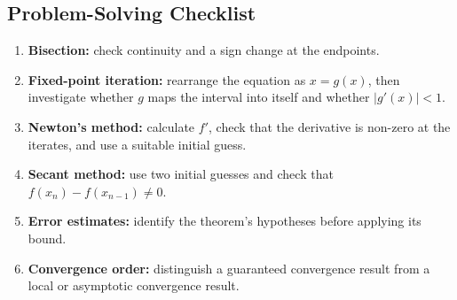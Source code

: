 \subsection{Problem-Solving Checklist}

\begin{remark}
  \begin{enumerate}\emph{}
    \item \textbf{Bisection:} check continuity and a sign change at the endpoints.
    \item \textbf{Fixed-point iteration:} rearrange the equation as \(x=g(x)\), then investigate whether \(g\) maps the interval into itself and whether \(|g'(x)|<1\).
    \item \textbf{Newton's method:} calculate \(f'\), check that the derivative is non-zero at the iterates, and use a suitable initial guess.
    \item \textbf{Secant method:} use two initial guesses and check that \(f(x_n)-f(x_{n-1})\neq0\).
    \item \textbf{Error estimates:} identify the theorem's hypotheses before applying its bound.
    \item \textbf{Convergence order:} distinguish a guaranteed convergence result from a local or asymptotic convergence result.
  \end{enumerate}
\end{remark}
